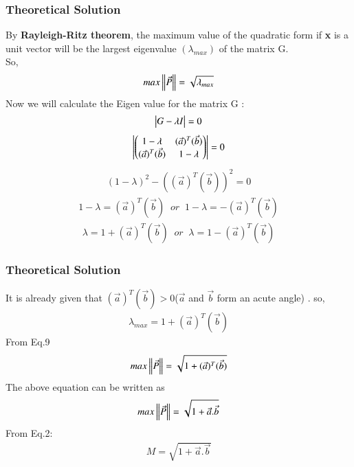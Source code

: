 \documentclass{beamer}
\begin{document}
\begin{frame}
\frametitle{Theoretical Solution}
    By \textbf{Rayleigh-Ritz theorem}, the maximum value of the quadratic form if \textbf{x} is a unit vector will be the largest eigenvalue $(\lambda_{max})$ of the matrix G.\\
So,
\begin{align}
    max\left\lVert\Vec{P}\right\rVert=\sqrt{\lambda_{max}}
\end{align}
Now we will calculate the Eigen value for the matrix G :
\begin{align}
    \begin{vmatrix}G-\lambda I\end{vmatrix}=0
\end{align}
\begin{align}
    \begin{vmatrix}\begin{pmatrix}1-\lambda&(\Vec{a})^T(\Vec{b})\\(\Vec{a})^T(\Vec{b})&1-\lambda\end{pmatrix}\end{vmatrix}=0
\end{align}
\begin{align}
    (1-\lambda)^2-((\Vec{a})^T(\Vec{b}))^2=0
\end{align}
\begin{align}
    1-\lambda=(\Vec{a})^T(\Vec{b})\;\;or\;\;1-\lambda=-(\Vec{a})^T(\Vec{b})
\end{align}
\begin{align}
    \lambda=1+(\Vec{a})^T(\Vec{b})\;\;or \;\;\lambda=1-(\Vec{a})^T(\Vec{b})
\end{align}


\end{frame}
\begin{frame}
\frametitle{Theoretical Solution}
  It is already given that $(\Vec{a})^T(\Vec{b})>0 $($\Vec{a}$ and $\Vec{b}$ form an acute angle) . so,
\begin{align}
 \lambda_{max}=1+  (\Vec{a})^T(\Vec{b}) 
\end{align}
From Eq.9
\begin{align}
    max\left\lVert\Vec{P}\right\rVert=\sqrt{1+  (\Vec{a})^T(\Vec{b}) }
\end{align}
The above equation can be written as
\begin{align}
   max \left\lVert\Vec{P}\right\rVert=\sqrt{1+\Vec{a}.\Vec{b}}
\end{align}
From Eq.2:
\begin{align}
    M=\sqrt{1+\Vec{a}.\Vec{b}}
\end{align}


\end{frame}
\end{document}
